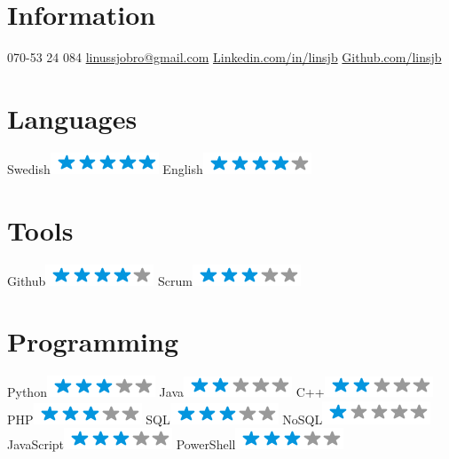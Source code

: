 \begin{aside}
    \section{Information}
      070-53 24 084
      \href{mailto:linussjobro@gmail.com}{linussjobro@gmail.com}
      \href{https://www.linkedin.com/in/linsjb}{Linkedin.com/in/linsjb}
      \href{https://github.com/linsjb}{Github.com/linsjb}
    \section{Languages}
      Swedish\includegraphics[scale=0.40]{img/5stars.png}
      English\includegraphics[scale=0.40]{img/4stars.png}
    \section{Tools}
      Github\includegraphics[scale=0.40]{img/4stars.png}
      Scrum\includegraphics[scale=0.40]{img/3stars.png}
    \section{Programming}
      Python\includegraphics[scale=0.40]{img/3stars.png}
      Java\includegraphics[scale=0.40]{img/2stars.png}
      C++\includegraphics[scale=0.40]{img/2stars.png}
      PHP\includegraphics[scale=0.40]{img/3stars.png}
      SQL\includegraphics[scale=0.40]{img/3stars.png}
      NoSQL\includegraphics[scale=0.40]{img/1stars.png}
      JavaScript\includegraphics[scale=0.40]{img/3stars.png}
      PowerShell\includegraphics[scale=0.40]{img/3stars.png}

\end{aside}
